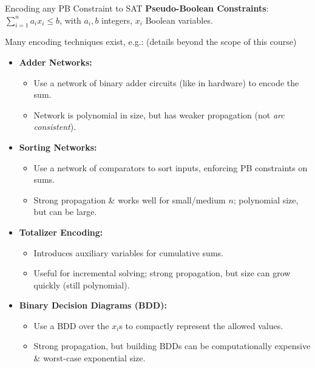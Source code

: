 \documentclass{cons-beamer}
\begin{document}
\begin{frame}{Encoding any PB Constraint to SAT}
  \small
  \textbf{Pseudo-Boolean Constraints}: $\sum_{i=1}^n a_i x_i \leq b$, with $a_i, b$ integers, $x_i$ Boolean variables.
  \vfill

  Many encoding techniques exist, e.g.: (details beyond the scope of this course)
  \begin{itemize}
    \item \textbf{Adder Networks:}
      \begin{itemize}
        \item Use a network of binary adder circuits (like in hardware) to encode the sum.
        \item Network is polynomial in size, but has weaker propagation (not \textit{arc consistent}).
      \end{itemize}
        
    \item \textbf{Sorting Networks:}
      \begin{itemize}
        \item Use a network of comparators to sort inputs, enforcing PB constraints on sums.
        \item Strong propagation \& works well for small/medium $n$; polynomial size, but can be large.
      \end{itemize}

    \item \textbf{Totalizer Encoding:}
      \begin{itemize}
        \item Introduces auxiliary variables for cumulative sums.
        \item Useful for incremental solving; strong propagation, but size can grow quickly (still polynomial).
      \end{itemize}
        
    \item \textbf{Binary Decision Diagrams (BDD):}
      \begin{itemize}
        \item Use a BDD over the $x_i$s to compactly represent the allowed values.
        \item Strong propagation, but building BDDs can be computationally expensive \& worst-case exponential size.
      \end{itemize}\vfill
  \end{itemize}
\end{frame}
\end{document}
